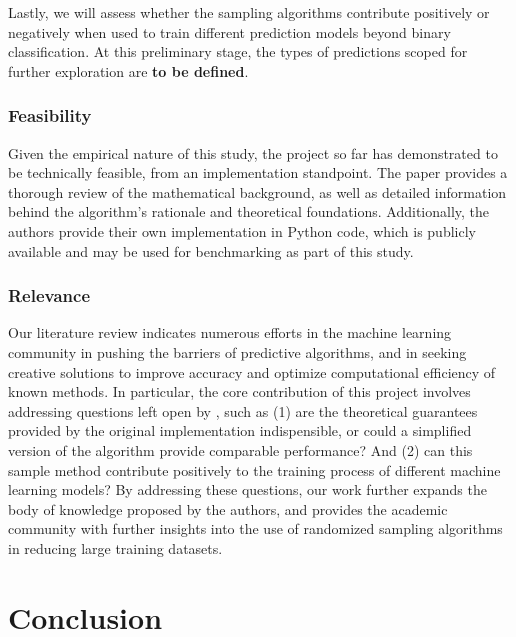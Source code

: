 \documentclass{article}
\theoremstyle{plain}
\theoremstyle{definition}
\theoremstyle{remark}
\begin{document}
Lastly, we will assess whether the sampling algorithms contribute positively or negatively when used to train different prediction models beyond binary classification. At this preliminary stage, the types of predictions scoped for further exploration are \textbf{to be defined}.


\subsubsection{Feasibility}

Given the empirical nature of this study, the project so far has demonstrated to be technically feasible, from an implementation standpoint. The paper \cite{chow24} provides a thorough review of the mathematical background, as well as detailed information behind the algorithm's rationale and theoretical foundations. Additionally, the authors provide their own implementation in Python code, which is publicly available and may be used for benchmarking as part of this study.


\subsubsection{Relevance}

Our literature review indicates numerous efforts in the machine learning community in pushing the barriers of predictive algorithms, and in seeking creative solutions to improve accuracy and optimize computational efficiency of known methods. In particular, the core contribution of this project involves addressing questions left open by \citeauthor{chow24}, such as (1) are the theoretical guarantees provided by the original implementation indispensible, or could a simplified version of the algorithm provide comparable performance? And (2) can this sample method contribute positively to the training process of different machine learning models? By addressing these questions, our work further expands the body of knowledge proposed by the authors, and provides the academic community with further insights into the use of randomized sampling algorithms in reducing large training datasets.


\section{Conclusion}
\end{document}
